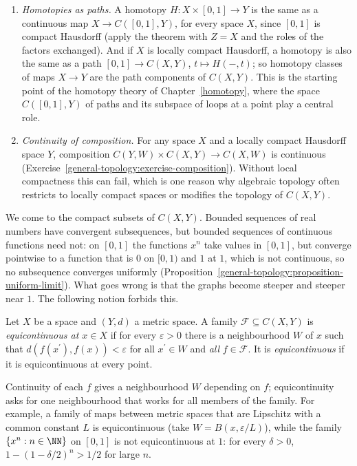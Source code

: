 \begin{example}\label{general-topology:example-exponential-law}
\begin{enumerate}
\item \emph{Homotopies as paths.} A homotopy $H \colon X \times [0, 1] \to Y$ is the same as a continuous map $X \to C([0, 1], Y)$, for every space $X$, since $[0, 1]$ is compact Hausdorff (apply
the theorem with $Z = X$ and the roles of the factors exchanged). And if $X$ is locally compact Hausdorff, a homotopy is also the same as a path $[0, 1] \to C(X, Y)$, $t \mapsto H(-, t)$; so
homotopy classes of maps $X \to Y$ are the path components of $C(X, Y)$. This is the starting point of the homotopy theory of Chapter~\ref{homotopy}, where the space $C([0, 1], Y)$ of paths and its
subspace of loops at a point play a central role.
\item \emph{Continuity of composition.} For any space $X$ and a locally compact Hausdorff space $Y$, composition $C(Y, W) \times C(X, Y) \to C(X, W)$ is continuous
(Exercise~\ref{general-topology:exercise-composition}). Without local compactness this can fail, which is one reason why algebraic topology often restricts to locally compact spaces or
modifies the topology of $C(X, Y)$.
\end{enumerate}
\end{example}

We come to the compact subsets of $C(X, Y)$. Bounded sequences of real numbers have convergent subsequences, but bounded sequences of continuous functions need not: on $[0, 1]$ the functions
$x^n$ take values in $[0, 1]$, but converge pointwise to a function that is $0$ on $[0, 1)$ and $1$ at $1$, which is not continuous, so no subsequence converges uniformly
(Proposition~\ref{general-topology:proposition-uniform-limit}). What goes wrong is that the graphs become steeper and steeper near $1$. The following notion forbids this.

\begin{definition}\label{general-topology:definition-equicontinuous}
Let $X$ be a space and $(Y, d)$ a metric space. A family $\mathcal{F} \subseteq C(X, Y)$ is \emph{equicontinuous at $x \in X$} if for every $\varepsilon > 0$ there is a neighbourhood $W$ of $x$
such that $d(f(x^{\prime}), f(x)) < \varepsilon$ for all $x^{\prime} \in W$ and \emph{all} $f \in \mathcal{F}$. It is \emph{equicontinuous} if it is equicontinuous at every point.
\end{definition}

Continuity of each $f$ gives a neighbourhood $W$ depending on $f$; equicontinuity asks for one neighbourhood that works for all members of the family. For example, a family of maps between metric
spaces that are Lipschitz with a common constant $L$ is equicontinuous (take $W = B(x, \varepsilon/L)$), while the family $\{x^n : n \in \NN\}$ on $[0, 1]$ is not equicontinuous at $1$: for every
$\delta > 0$, $1 - (1 - \delta/2)^n > 1/2$ for large $n$.

